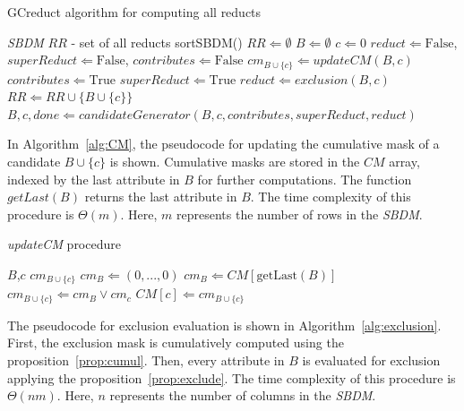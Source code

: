 \documentclass[number,preprint,review,12pt]{elsarticle}
\begin{document}
	\begin{algorithm}
	\footnotesize
	\caption{GCreduct algorithm for computing all reducts}
	\label{alg:GCreduct}
	\begin{algorithmic}[1]
		\Require \textit{SBDM}
		\Ensure $RR$ - set of all reducts
		\State sortSBDM()
		\State $RR \Leftarrow \emptyset$
		\State $B \Leftarrow \emptyset$  
		\State $c \Leftarrow 0$ 
			\State $reduct \Leftarrow \mathrm{False}$, $superReduct \Leftarrow \mathrm{False}$, $contributes \Leftarrow \mathrm{False}$
		  	\State $cm_{B\cup \lbrace c\rbrace} \Leftarrow updateCM(B,c)$
		  	\label{line:contrib}
		  		\State $contributes \Leftarrow \mathrm{True}$
		  		\label{line:superReduct}
		  			\State $superReduct \Leftarrow \mathrm{True}$
		  			\State $reduct \Leftarrow exclusion(B,c)$
		  				\State $RR \Leftarrow RR \cup \lbrace B\cup \lbrace c\rbrace \rbrace$
		  			\EndIf
		  		\EndIf
		  	\EndIf
			\State $B,c,done \Leftarrow candidateGenerator(B,c,contributes,superReduct,reduct)$
	\EndWhile 
		\end{algorithmic}
	\end{algorithm}
	
	In Algorithm~\ref{alg:CM}, the pseudocode for updating the cumulative mask of a candidate $B\cup\lbrace c\rbrace$ is shown. Cumulative masks are stored in the $CM$ array, indexed by the last attribute in $B$ for further computations. The function $getLast(B)$ returns the last attribute in $B$. The time complexity of this procedure is $\Theta(m)$. Here, $m$ represents the number of rows in the \textit{SBDM}.
		
	\begin{algorithm}
	\footnotesize
	\caption{\textit{updateCM} procedure}
	\label{alg:CM}
	\begin{algorithmic}[1]
		\Require $B$,$c$
		\Ensure $cm_{B\cup \lbrace c\rbrace}$	
		\label{line:emptyB}
			\State $cm_B \Leftarrow (0,...,0)$
		\Else
			\State $cm_B \Leftarrow CM[\mathrm{getLast}(B)]$\label{line:notEmpty}
		\EndIf
		\State $cm_{B\cup \lbrace c\rbrace} \Leftarrow cm_B \vee cm_c$\label{line:updateCM}
		\State $CM[c] \Leftarrow cm_{B\cup \lbrace c\rbrace}$
	\end{algorithmic}
	\end{algorithm}
	
	The pseudocode for exclusion evaluation is shown in Algorithm~\ref{alg:exclusion}. First, the exclusion mask is cumulatively computed using the proposition~\ref{prop:cumul}. Then, every attribute in $B$ is evaluated for exclusion applying the proposition~\ref{prop:exclude}. The time complexity of this procedure is $\Theta(nm)$. Here, $n$ represents the number of columns in the \textit{SBDM}.
	
\end{document}
